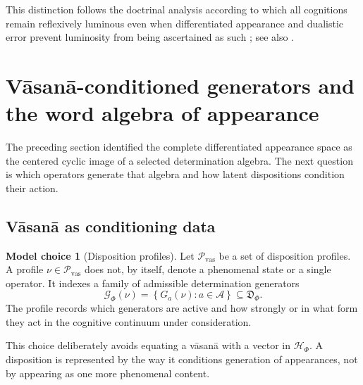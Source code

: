 \documentclass[11pt,reqno]{scrartcl}
\newcommand{\scrHF}{\mathscr H_{\Phi}}
\newcommand{\detAlg}{\mathfrak D_{\Phi}}
\newcommand{\vasSpace}{\mathcal P_{\mathrm{vas}}}
\newcommand{\vas}{\nu}
\newcommand{\genSet}{\mathcal G_{\Phi}}
\theoremstyle{plain}
\theoremstyle{definition}
\newtheorem{modelchoice}[modelchoice]{Model choice}
\theoremstyle{remark}
\begin{document}
This distinction follows the doctrinal analysis according to which all
cognitions remain reflexively luminous even when differentiated appearance
and dualistic error prevent luminosity from being ascertained as such
\cite[pp.~162--163]{Yiannopoulos2012}; see also
\cite[pp.~424--425]{Yiannopoulos2020}.
\section{V\=asan\=a-conditioned generators and the word algebra of appearance}
\label{sec:vasana-generator-system}

The preceding section identified the complete differentiated appearance space
as the centered cyclic image of a selected determination algebra.  The next
question is which operators generate that algebra and how latent dispositions
condition their action.

\subsection{V\=asan\=a as conditioning data}

\begin{modelchoice}[Disposition profiles]
\label{choice:vasana-profiles}
Let $\vasSpace$ be a set of disposition profiles.  A profile
$\vas\in\vasSpace$ does not, by itself, denote a phenomenal state or a
single operator.  It indexes a family of admissible determination generators
\begin{equation}
  \genSet(\vas)
  =\left\{G_a(\vas):a\in\mathcal A\right\}
  \subseteq\detAlg.
  \label{eq:vasana-generator-family}
\end{equation}
The profile records which generators are active and how strongly or in what
form they act in the cognitive continuum under consideration.
\end{modelchoice}

This choice deliberately avoids equating a v\=asan\=a with a vector in
$\scrHF$.  A disposition is represented by the way it conditions generation
of appearances, not by appearing as one more phenomenal content.
\end{document}
